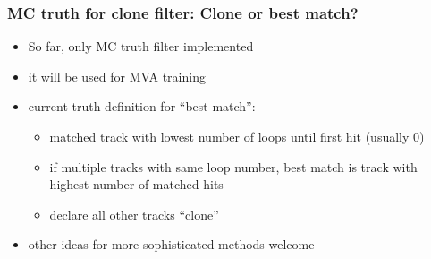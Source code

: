 \documentclass[18pt]{beamer}
\begin{document}
\begin{frame}
  \frametitle{MC truth for clone filter: Clone or best match?}
  \begin{itemize}
  \item So far, only MC truth filter implemented
  \item it will be used for MVA training
  \item current truth definition for ``best match'':
    \begin{itemize}
    \item matched track with lowest number of loops until first hit
      (usually 0)
    \item if multiple tracks with same loop number, best match is track with highest number of matched hits
    \item declare all other tracks ``clone''
    \end{itemize}
  \item other ideas for more sophisticated methods welcome
\end{itemize}
\end{frame}
\end{document}
